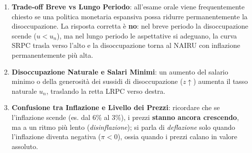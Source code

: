 \begin{esame}
\begin{enumerate}
    \item \textbf{Trade-off Breve vs Lungo Periodo}: all'esame orale viene frequentemente chiesto se una politica monetaria espansiva possa ridurre permanentemente la disoccupazione. La risposta corretta è \textbf{no}: nel breve periodo la disoccupazione scende ($u < u_n$), ma nel lungo periodo le aspettative si adeguano, la curva SRPC trasla verso l'alto e la disoccupazione torna al NAIRU con inflazione permanentemente più alta.
    \item \textbf{Disoccupazione Naturale e Salari Minimi}: un aumento del salario minimo o della generosità dei sussidi di disoccupazione ($z \uparrow$) aumenta il tasso naturale $u_n$, traslando la retta LRPC verso destra.
    \item \textbf{Confusione tra Inflazione e Livello dei Prezzi}: ricordare che se l'inflazione scende (es. dal $6$\% al $3$\%), i prezzi \textbf{stanno ancora crescendo}, ma a un ritmo più lento (\textit{disinflazione}); si parla di \textit{deflazione} solo quando l'inflazione diventa negativa ($\pi < 0$), ossia quando i prezzi calano in valore assoluto.
\end{enumerate}
\end{esame}
